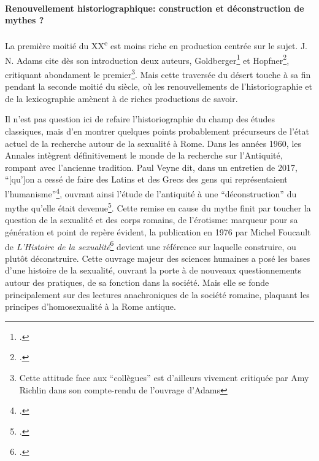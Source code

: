 
\paragraph{Renouvellement historiographique: construction et déconstruction de mythes ?}

La première moitié du XX\textsuperscript{e} est moins riche en production centrée sur le sujet. J. N. Adams cite dès son introduction deux auteurs, Goldberger\footcite{goldberger_kraftausdrucke_1929, goldberger_kraftausdrucke_1931} et Hopfner\footcite{hopfner_sexualleben_1938}, critiquant abondament le premier\footnote{Cette attitude face aux \enquote{collègues} est d'ailleurs vivement critiquée par Amy Richlin dans son compte-rendu de l'ouvrage d'Adams}. Mais cette traversée du désert touche à sa fin pendant la seconde moitié du siècle, où les renouvellements de l'historiographie et de la lexicographie amènent à de riches productions de savoir.

Il n'est pas question ici de refaire l'historiographie du champ des études classiques, mais d'en montrer quelques points probablement précurseurs de l'état actuel de la recherche autour de la sexualité à Rome. Dans les années 1960, les Annales intègrent définitivement le monde de la recherche sur l'Antiquité, rompant avec l'ancienne tradition. Paul Veyne dit, dans un entretien de 2017, \enquote{[qu']on a cessé de faire des Latins et des Grecs des gens qui représentaient l’humanisme}\footcite{paul_veyne_entretien_2017}, ouvrant ainsi l'étude de l'antiquité à une \enquote{déconstruction} du mythe qu'elle était devenue\footcite{dupont_antiquite_2013}. Cette remise en cause du mythe finit par toucher la question de la sexualité et des corps romains, de l'érotisme: marqueur pour sa génération et point de repère évident, la publication en 1976 par Michel Foucault de \textit{L'Histoire de la sexualité}\footcite{foucault_histoire_1976} devient une référence sur laquelle construire, ou plutôt déconstruire. Cette ouvrage majeur des sciences humaines a posé les bases d'une histoire de la sexualité, ouvrant la porte à de nouveaux questionnements autour des pratiques, de sa fonction dans la société. Mais elle se fonde principalement sur des lectures anachroniques de la société romaine, plaquant les principes d'homosexualité à la Rome antique.

